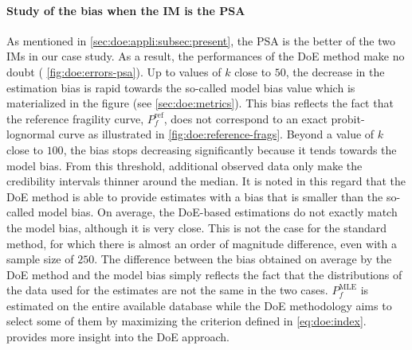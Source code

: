 \paragraph{Study of the bias when the IM is the PSA}
As mentioned in \cref{sec:doe:appli:subsec:present}, the PSA is the better of the two IMs in our case study. As a result, the performances of the DoE method make no doubt ( \cref{fig:doe:errors-psa}). Up to values of $k$ close to $50$, the decrease in the estimation bias is rapid towards the so-called model bias value which is materialized in the figure (see \cref{sec:doe:metrics}). This bias reflects the fact that the reference fragility curve, $P_f^{\text{ref}}$, does not correspond to an exact probit-lognormal curve as illustrated in  \cref{fig:doe:reference-frags}. Beyond a value of $k$ close to $100$, the bias stops decreasing significantly because it tends towards the model bias. From this threshold, additional observed data only make the credibility intervals thinner around the median. It is noted in this regard that the DoE method is able to provide estimates with a bias that is smaller than the so-called model bias. On average, the DoE-based estimations do not exactly match the model bias, although it is very close. This is not the case for the standard method, for which there is almost an order of magnitude difference, even with a sample size of $250$. The difference between the bias obtained on average by the DoE method and the model bias simply reflects the fact that the distributions of the data used for the estimates are not the same in the two cases. $P_f^{\text{MLE}}$ is estimated on the entire available database while the DoE methodology aims to select some of them by maximizing the criterion defined in \cref{eq:doe:index}.  provides more insight into the DoE approach.

